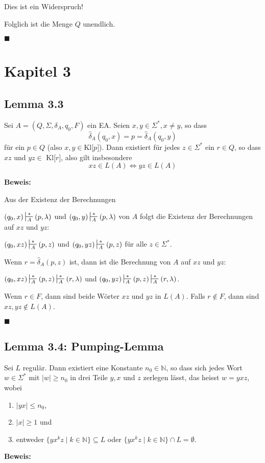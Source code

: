 \documentclass[a4paper, 11pt]{article}
\def\N{\mathbb{N}}
\begin{document}
    Dies ist ein Widerspruch! 

    Folglich ist die Menge $Q$ unendlich.

    \hspace*{0pt}\hfill$\blacksquare$


    \section*{Kapitel 3}
    \subsection*{Lemma 3.3}
    Sei $A = (Q, \Sigma, \delta_A, q_0, F)$ ein EA. Seien $x, y \in \Sigma^*, x \neq y$, so dass 
    $$\hat{\delta}_A(q_0, x) = p = \hat{\delta}_A(q_0, y)$$
    für ein $p \in Q$ (also $x,y \in \text{Kl[$p$]}$). Dann existiert für jedes $z \in \Sigma^*$ ein $r \in Q$, so dass $xz$ und $yz \in$ Kl[$r$], also gilt insbesondere 
    $$xz \in L(A) \iff yz \in L(A)$$
    
    \textbf{Beweis: }
    
    Aus der Existenz der Berechnungen 

    $(q_0, x) \sststile{A}{*} (p, \lambda)$ und $(q_0, y) \sststile{A}{*} (p, \lambda)$
    von $A$ folgt die Existenz der Berechnungen auf $xz$ und $yz$:

    $(q_0, xz) \sststile{A}{*} (p, z)$ und $(q_0, yz) \sststile{A}{*} (p, z)$ für alle $z \in \Sigma^*$.

    Wenn $r = \hat{\delta}_A(p, z)$ ist, dann ist die Berechnung von $A$ auf $xz$ und $yz$:

    $(q_0, xz) \sststile{A}{*} (p, z) \sststile{A}{*} (r, \lambda)$ und $(q_0, yz) \sststile{A}{*} (p, z) \sststile{A}{*} (r, \lambda)$.

    Wenn $r \in F$, dann sind beide Wörter $xz$ und $yz$ in $L(A)$. Falls $r \notin F$, dann sind $xz, yz \notin L(A)$.

    \hspace*{0pt}\hfill$\blacksquare$

    \subsection*{Lemma 3.4: Pumping-Lemma}
    Sei $L$ regulär. Dann existiert eine Konstante $n_0 \in \N$, so dass sich jedes Wort $w \in \Sigma^*$ mit $|w| \geq n_0$ in drei Teile $y, x$ und $z$ zerlegen lässt, das heisst $w = yxz$, wobei
    \begin{enumerate}[label = (\roman*)]
        \item $|yx| \leq n_0$,
        \item $|x| \geq 1$ und
        \item entweder $\{yx^kz \mid k \in \N\} \subseteq L$ oder $\{yx^kz \mid k \in \N\} \cap L = \emptyset$.
    \end{enumerate}
    \textbf{Beweis: }
\end{document}
